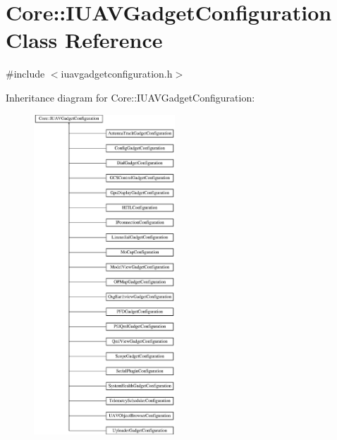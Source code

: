 \hypertarget{class_core_1_1_i_u_a_v_gadget_configuration}{\section{\-Core\-:\-:\-I\-U\-A\-V\-Gadget\-Configuration \-Class \-Reference}
\label{class_core_1_1_i_u_a_v_gadget_configuration}
}


{\ttfamily \#include $<$iuavgadgetconfiguration.\-h$>$}

\-Inheritance diagram for \-Core\-:\-:\-I\-U\-A\-V\-Gadget\-Configuration\-:\begin{figure}[H]
\begin{center}
\leavevmode
\includegraphics[height=12.000000cm]{class_core_1_1_i_u_a_v_gadget_configuration}
\end{center}
\end{figure}
